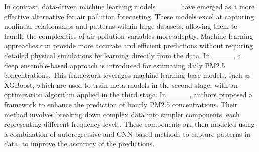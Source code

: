 In contrast, data-driven machine learning models ____ have emerged as a more effective alternative for air pollution forecasting. These models excel at capturing nonlinear relationships and patterns within large datasets, allowing them to handle the complexities of air pollution variables more adeptly. Machine learning approaches can provide more accurate and efficient predictions without requiring detailed physical simulations by learning directly from the data. 
In ____, a deep ensemble-based approach is introduced for estimating daily PM2.5 concentrations. This framework leverages machine learning base models, such as XGBoost, which are used to train meta-models in the second stage, with an optimization algorithm applied in the third stage.
In ____, authors proposed a framework to enhance the prediction of hourly PM2.5 concentrations. Their method involves breaking down complex data into simpler components, each representing different frequency levels. These components are then modeled using a combination of autoregressive and CNN-based methods to capture patterns in data, to improve the accuracy of the predictions.


